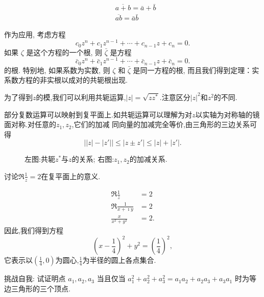 \begin{equation}
    \begin{aligned}
    & \overline{a+b}=\bar{a}+\bar{b} \\
    & \overline{a b}=\bar{a} \bar{b}
    \end{aligned}
\end{equation}

作为应用, 考虑方程
$$
c_0 z^n+c_1 z^{n-1}+\cdots+c_{n-1} z+c_n=0 .
$$
如果 $\zeta$ 是这个方程的一个根, 则 $\bar{\zeta}$ 是方程
$$
\bar{c}_0 z^n+\bar{c}_1 z^{n-1}+\cdots+\bar{c}_{n-1} z+\bar{c}_n=0 .
$$
的根. 特别地, 如果系数为实数, 则 $\zeta$ 和 $\bar{\zeta}$ 是同一方程的根, 
而且我们得到定理：实系数方程的非实根以成对的共轭根出现.

为了得到$z$的模,我们可以利用共轭运算,$|z| = \sqrt{zz^{*}}$.注意区分$|z|^2$和$z^2$的不同.

部分复数运算可以映射到复平面上.如共轭运算可以理解为对$z$以实轴为对称轴的镜面对称.对任意的$z_1,z_2$,它们的加减
同向量的加减完全等价,由三角形的三边关系可得
\begin{equation}
    \left| |z|- |z'| \right| \leq |z \pm z'| \leq |z| + |z'| .
\end{equation}
\begin{figure}[h]
    \centering
    
\quad 
        
        \caption{左图:共轭$z^{*}$与$z$的关系; 右图:$z_1, z_2$的加减关系.}
\end{figure}
 

\begin{example}
讨论$\Re \frac{1}{z} = 2$在复平面上的意义.
\end{example}
\begin{solution}
    \begin{align*}
        \Re \frac{1}{z} &= 2\\
        \Re \frac{1}{x+\imath y} &  = 2 \\
        \frac{x}{x^2 +y^2} & = 2 .
    \end{align*}
因此,我们得到方程
\[
    (x-\frac{1}{4})^2 + y^2 = \left( \frac{1}{4}\right)^2,
\]
它表示以$(\frac{1}{4},0)$为圆心,$\frac{1}{4}$为半径的圆上各点集合.
\end{solution}
        

\begin{note}
    挑战自我: 试证明点 $a_1, a_2, a_3$ 当且仅当 
    $a_1^2+a_2^2+a_3^2=a_1 a_2+a_2 a_3+a_3 a_1$ 时为等边三角形的三个顶点.    
\end{note}


